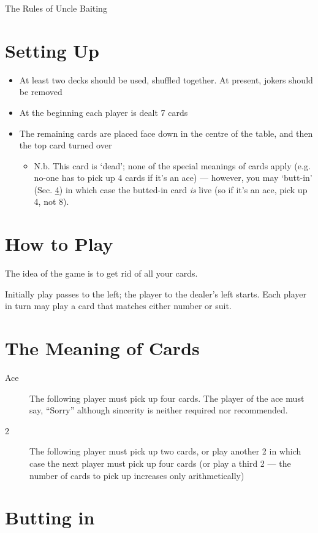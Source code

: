 \documentclass[12pt]{article}
\newcommand{\Sec}[1]{Sec. \ref{#1}}
\begin{document}
\begin{center}
  \large The Rules of Uncle Baiting
\end{center}


\section{Setting Up}

\begin{itemize}
\item At least two decks should be used, shuffled together.  At present, jokers should be removed
  
\item At the beginning each player is dealt 7 cards
  
\item The remaining cards are placed face down in the centre of the table, and then the
  top card turned over

  \begin{itemize}
    \item N.b. This card is `dead'; none of the special meanings of cards apply (e.g.
      no-one has to pick up 4 cards if it's an ace) --- however, you 
      may `butt-in' (\Sec{buttingIn}) in which case the butted-in card \textit{is}
      live (so if it's an ace, pick up 4, not 8).
  \end{itemize}
\end{itemize}

\section{How to Play}

The idea of the game is to get rid of all your cards.

Initially play passes to the left; the player to the dealer's left starts.  Each player in
turn may play a card that matches either number or suit.

\section{The Meaning of Cards}

\begin{description}
\item[Ace]
  The following player must pick up four cards.  The player of the ace must say, ``Sorry'' although sincerity is neither required nor recommended.

  \item[2]
    The following player must pick up two cards, or play another 2 in which case the next player must
    pick up four cards (or play a third 2 --- the number of cards to pick up increases only arithmetically)

\end{description}

\section{Butting in}
\label{buttingIn}
\end{document}
